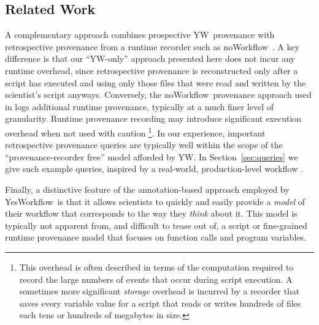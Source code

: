 \documentclass[letterpaper,twocolumn,10pt]{article}
\newcommand{\NW}{\textsf{noWorkflow}}
\newcommand{\YW}{\textsf{YesWorkflow}}
\newcommand{\yw}{\textsf{YW}}
\begin{document}
\subsection*{Related Work}
A complementary approach \cite{dey15} combines prospective \yw\
provenance with retrospective provenance from a runtime recorder such
as \NW\ \cite{murta2014nw}. A key difference is that our ``\yw-only''
approach presented here does not incur any runtime overhead, since
retrospective provenance is reconstructed only after a script has
executed and using only those files that were read and written by the
scientist's script anyways. Conversely, the \NW\ provenance approach
used in \cite{dey15} logs additional runtime provenance, typically at
a much finer level of granularity. Runtime provenance recording may
introduce significant execution overhead when not used with
caution \footnote{This overhead is often described in terms of the 
computation required to record the large numbers of events that occur
during script execution.  A sometimes more significant
\emph{storage} overhead is incurred by a recorder that saves every variable
value for a script that reads or writes hundreds of files each tens or hundreds of megabytes
in size.}. In our experience, important retrospective provenance queries
are typically well within the scope of the ``provenance-recorder
free'' model afforded by \yw.  In Section~\ref{sec:queries} we give
such example queries, inspired by a real-world, production-level
workflow \cite{tsai2013autodrug}.

Finally, a distinctive feature of the annotation-based approach
employed by \YW\ is that it allows scientists to quickly and easily
provide a \emph{model} of their workflow that corresponds to the way
they \emph{think} about it. This model is
typically not apparent from, and difficult to tease out of, a script
or fine-grained runtime provenance model that focuses on function
calls and program variables.


\end{document}
